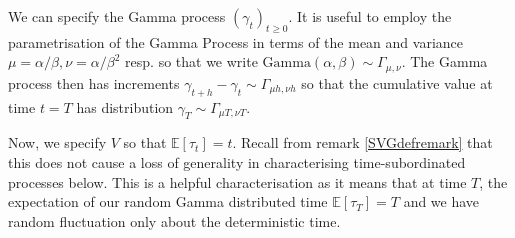 \documentclass{article}
\begin{document}
\begin{example}
We can specify the Gamma process $(\gamma_t)_{t\geq0}$. It is useful to employ the parametrisation of the Gamma Process in terms of the mean and variance $\mu = \alpha/\beta, \nu = \alpha/\beta^2$ resp. so that we write $\text{Gamma}(\alpha,\beta)\sim\Gamma_{\mu,\nu}$. The Gamma process then has increments $\gamma_{t+h}-\gamma_t\sim \Gamma_{\mu h,\nu h}$ so that the cumulative value at time $t=T$ has distribution 
$\gamma_T \sim \Gamma_{\mu T, \nu T}$.
\end{example}

Now, we specify $V$ so that $\mathbb{E}[\tau_t] = t$. Recall from remark \ref{SVGdefremark} that this does not cause a loss of generality in characterising time-subordinated processes below. This is a helpful characterisation as it means that at time $T$, the expectation of our random Gamma distributed time $\mathbb{E}[\tau_T] = T$ and we have random fluctuation only about the deterministic time.

\end{document}
